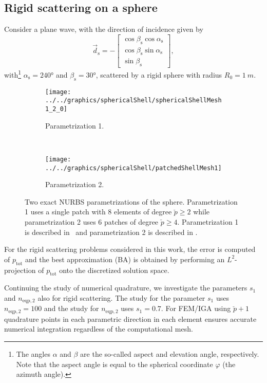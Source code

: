 \subsection{Rigid scattering on a sphere} 
Consider a plane wave, with the direction of incidence given by
\begin{equation}\label{Eq3:d_s}
	\vec{d}_{\mathrm{s}} = -\begin{bmatrix}
		\cos\beta_{\mathrm{s}}\cos\alpha_{\mathrm{s}}\\
		\cos\beta_{\mathrm{s}}\sin\alpha_{\mathrm{s}}\\
		\sin\beta_{\mathrm{s}}
	\end{bmatrix},
\end{equation}
with\footnote{The angles $\alpha$ and $\beta$ are the so-called aspect and elevation angle, respectively. Note that the aspect angle is equal to the spherical coordinate $\varphi$ (the azimuth angle).} $\alpha_{\mathrm{s}} = \ang{240}$ and $\beta_{\mathrm{s}} = \ang{30}$, scattered by a rigid sphere with radius $R_0=\SI{1}{m}$. 
\begin{figure}
	\centering
	\begin{subfigure}[t]{0.3\textwidth}
		\texttt{[image: ../../graphics/sphericalShell/sphericalShellMesh1\_2\_0]}
		\caption{Parametrization 1.}
		\label{Fig3:parm1}
	\end{subfigure} 
	~
	\begin{subfigure}[t]{0.3\textwidth}
		\texttt{[image: ../../graphics/sphericalShell/patchedShellMesh1]}
		\caption{Parametrization 2.}
		\label{Fig3:parm2}
	\end{subfigure} 
	\caption{Two exact NURBS parametrizations of the sphere. Parametrization 1 uses a single patch with 8 elements of degree $\check{p}\geq 2$ while parametrization 2 uses 6 patches of degree $\check{p}\geq 4$. Parametrization 1 is described in~ and parametrization 2 is described in .}
	\label{Fig3:SphericalShellParametrizations}
\end{figure}

For the rigid scattering problems considered in this work, the error is computed of $p_{\mathrm{tot}}$ and the best approximation (BA) is obtained by performing an $L^2$-projection of $p_{\mathrm{tot}}$ onto the discretized solution space.

Continuing the study of numerical quadrature, we investigate the parameters $s_1$ and $n_{\mathrm{eqp},2}$ also for rigid scattering. The study for the parameter $s_1$ uses $n_{\mathrm{eqp},2}=100$ and the study for $n_{\mathrm{eqp},2}$ uses $s_1=0.7$. For FEM/IGA using $\check{p}+1$ quadrature points in each parametric direction in each element ensures accurate numerical integration regardless of the computational mesh. 

